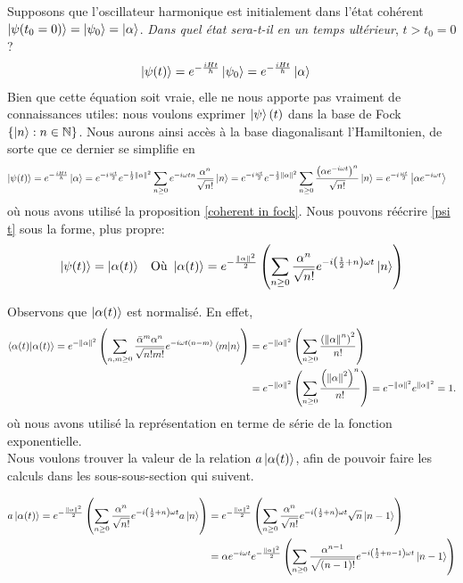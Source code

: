 \documentclass[11pt,oneside,a4paper]{article}
\newcommand{\h}{\ensuremath{\hbar}}
\begin{document}
Supposons que l'oscillateur harmonique est initialement dans l'état cohérent $\ket{\psi (t_0 = 0)} = \ket{\psi_0} = \ket{\alpha}$. \emph{Dans quel état sera-t-il en un temps ultérieur}, $t>t_0 = 0$ ?
\begin{align}
  \ket{\psi(t)} &= e^{-\frac{iHt}{\h}}\ket{\psi_0} = e^{-\frac{iHt}{\h}}\ket{\alpha}  
\end{align}
Bien que cette équation soit vraie, elle ne nous apporte pas vraiment de connaissances utiles: nous voulons exprimer $\ket{\psi} (t)$ dans la base de Fock $\left\{\ket{n} : n\in\mathbb{N}\right\}$. Nous aurons ainsi accès à la base diagonalisant l'Hamiltonien, de sorte que ce dernier se simplifie en
\begin{align}
  \ket{\psi(t)} = e^{-\frac{iHt}{\h}}\ket{\alpha} &= e^{-i\frac{\omega t}{2}}e^{-\frac{1}{2}\norm{\alpha}^2}\sum_{n\geq 0}e^{-i\omega tn}\frac{\alpha^n}{\sqrt{n!}}\ket{n}
  = e^{-i\frac{\omega t}{2}}e^{-\frac{1}{2}\norm{\alpha}^2}\sum_{n\geq 0}\frac{\left(\alpha e^{-i\omega t}\right)^n}{\sqrt{n!}}\ket{n}
  = e^{-i\frac{\omega t}{2}}\ket{\alpha e^{-i\omega t}}\label{psi t}
\end{align}
où nous avons utilisé la proposition \eqref{coherent in fock}. Nous pouvons réécrire \eqref{psi t} sous la forme, plus propre:
\begin{align}
  \ket{\psi(t)} &= \ket{\alpha(t)} &\text{Où }\ket{\alpha(t)} = e^{-\frac{\norm{\alpha}^2}{2}}\left(\sum_{n\geq 0}\frac{\alpha^n}{\sqrt{n!}}e^{-i\left(\frac{1}{2}+n    \right)\omega t}\ket{n}\right) 
\end{align}

Observons que $\ket{\alpha(t)}$ est normalisé. En effet,
\begin{align}
  \braket{\alpha(t)} = e^{-\norm{\alpha}^2}\left(\sum_{n,m\geq 0}\frac{\bar{\alpha}^m\alpha^n}{\sqrt{n!m!}}e^{-i\omega t\left(n-m\right)}\braket{m}{n}\right)
  &= e^{-\norm{\alpha}^2}\left(\sum_{n\geq 0}\frac{\left(\norm{\alpha}^n\right)^2}{n!}\right)\\
  &= e^{-\norm{\alpha}^2}\left(\sum_{n\geq 0}\frac{\left(\norm{\alpha}^2\right)^n}{n!}\right) = e^{-\norm{\alpha}^2}e^{\norm{\alpha}^2} = 1.
\end{align}
où nous avons utilisé la représentation en terme de série de la fonction exponentielle.\\

Nous voulons trouver la valeur de la relation $a\ket{\alpha(t)}$, afin de pouvoir faire les calculs dans les sous-sous-section qui suivent.

\begin{align}
  a\ket{\alpha(t)} = e^{-\frac{\norm{\alpha}^2}{2}}\left(\sum_{n\geq 0}\frac{\alpha^n}{\sqrt{n!}}e^{-i\left(\frac{1}{2}+n\right)\omega t}a\ket{n}\right)
  &= e^{-\frac{\norm{\alpha}^2}{2}}\left(\sum_{n\geq 0}\frac{\alpha^n}{\sqrt{n!}}e^{-i\left(\frac{1}{2}+n    \right)\omega t}\sqrt{n}\ket{n-1}\right)\\
  &= \alpha e^{-i\omega t}e^{-\frac{\norm{\alpha}^2}{2}}\left(\sum_{n\geq 0}\frac{\alpha^{n-1}}{\sqrt{(n-1)!}}e^{-i\left(\frac{1}{2}+n-1    \right)\omega t}\ket{n-1}\right)
\end{align}
\end{document}
